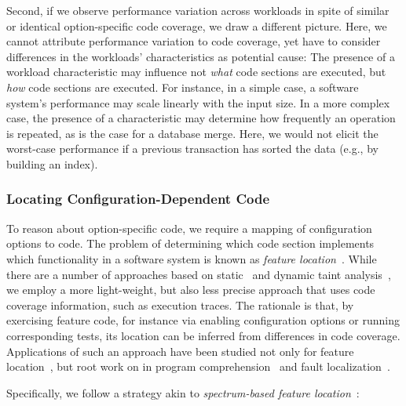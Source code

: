 {Second, if we observe performance variation across workloads in spite of similar or identical option-specific code coverage, we draw a different picture. Here, we cannot attribute performance variation to code coverage, yet have to consider differences in the workloads’ characteristics as potential cause: The presence of a workload characteristic may influence not  \emph{what} code sections are executed, but \emph{how} code sections are executed. For instance, in a simple case, a software system’s performance may scale linearly with the input size. In a more complex case, the presence of a characteristic may determine how frequently an operation is repeated, as is the case for a database merge. Here, we would not elicit the worst-case performance if a previous transaction has sorted the data (e.g., by building an index).

\subsubsection{Locating Configuration-Dependent Code}
To reason about option-specific code, we require a mapping of configuration options to code. 
The problem of determining which code section implements which functionality in a software system is known as \emph{feature location}~\cite{rubin_feature_2013}. 
While there are a number of approaches based on static~\cite{velez_2020_configcrusher_jase,lillack_2018_lotrack_tse,luo_2019_cova} and dynamic taint analysis~\cite{bell_phosphor_2014,velez_comprex_2021,splat_kim_2013}, we employ a more light-weight,  but also less precise approach that uses code coverage information, such as execution traces.
The rationale is that, by exercising feature code, for instance via enabling configuration options or running corresponding tests, its location can be inferred from differences in code coverage. 
Applications of such an approach have been studied not only for feature location~\cite{wong_integrated_2005,sulir_annotation_2015,michelon_spectrum_2021,perez_framing_2016}, but root work on in program comprehension~\cite{wilde_early_1996,wilde_reconnaissance_1995,sherwood_reducing_nodate,perez_diagnosis_2014,castro_pangolin_2019} and fault localization~\cite{agrawal_fault_1995,wong_faultloc_2016}. 
}
Specifically, we follow  a strategy akin to  \textit{spectrum-based feature location}~\cite{michelon_spectrum_2021}:

